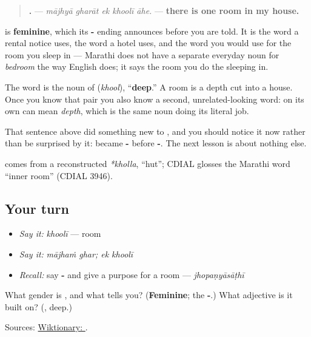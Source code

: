 \begin{quote}
\textbf{    .} — \emph{mājhyā gharāt ek khoolī āhe.} — \textbf{there is one room in my house.}
\end{quote}

\textbf{} is \textbf{feminine}, which its \textbf{-} ending announces before you are told. It is the word a rental notice uses, the word a hotel uses, and the word you would use for the room you sleep in — Marathi does not have a separate everyday noun for \emph{bedroom} the way English does; it says the room you do the sleeping in.

The word is the noun of \textbf{} (\emph{khool}), \textquotedblleft{}\textbf{deep}.\textquotedblright{} A room is a depth cut into a house. Once you know that pair you also know a second, unrelated-looking word: \textbf{} on its own can mean \emph{depth}, which is the same noun doing its literal job.

That sentence above did something new to \textbf{}, and you should notice it now rather than be surprised by it: \textbf{} became \textbf{-} before \textbf{-}. The next lesson is about nothing else.

\begin{cousinweb}
\textbf{} comes from a reconstructed \emph{*kholla}, \textquotedblleft{}hut\textquotedblright{}; CDIAL glosses the Marathi word \textquotedblleft{}inner room\textquotedblright{} (CDIAL 3946).
\end{cousinweb}

\subsection*{Your turn}
\begin{itemize}
\raggedright
  \item \emph{Say it:} \emph{khoolī} — room
  \item \emph{Say it:} \emph{mājhaṁ ghar; ek khoolī}
  \item \emph{Recall:} say \textbf{-} and give a purpose for a room — \emph{jhopaṇyāsāṭhī}
\end{itemize}

\begin{tcolorbox}[breakable,colback=teal!4,colframe=teal!35!black,title={Before you move on}]
What gender is \textbf{}, and what tells you? (\textbf{Feminine}; the \textbf{-}.) What adjective is it built on? (\textbf{}, deep.)

Sources: \href{https://en.wiktionary.org/wiki/\%E0\%A4\%96\%E0\%A5\%8B\%E0\%A4\%B2\%E0\%A5\%80}{Wiktionary: }.
\end{tcolorbox}
